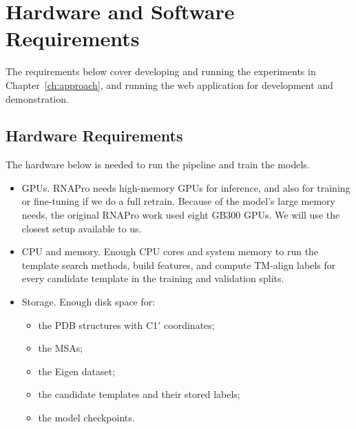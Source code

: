 \documentclass{FastFyp}
\begin{document}
\section{Hardware and Software Requirements}
The requirements below cover developing and running the experiments in Chapter~\ref{ch:approach}, and running the web application for development and demonstration.

\subsection{Hardware Requirements}
The hardware below is needed to run the pipeline and train the models.
\begin{itemize}
    \item GPUs. RNAPro needs high-memory GPUs for inference, and also for training or fine-tuning if we do a full retrain. Because of the model's large memory needs, the original RNAPro work used eight GB300 GPUs. We will use the closest setup available to us.
    \item CPU and memory. Enough CPU cores and system memory to run the template search methods, build features, and compute TM-align labels for every candidate template in the training and validation splits.
    \item Storage. Enough disk space for:
    \begin{itemize}
    \item the PDB structures with C1$'$ coordinates;
    \item the MSAs;
    \item the Eigen dataset;
    \item the candidate templates and their stored labels;
    \item the model checkpoints.
    \end{itemize}
\end{itemize}
\end{document}
